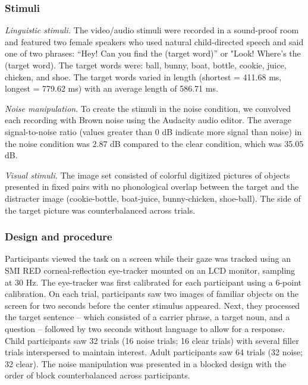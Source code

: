 \documentclass[,man,floatsintext]{apa6}
\begin{document}
\hypertarget{stimuli-1}{%
\subsubsection{Stimuli}\label{stimuli-1}}

\emph{Linguistic stimuli.} The video/audio stimuli were recorded in a
sound-proof room and featured two female speakers who used natural
child-directed speech and said one of two phrases: \enquote{Hey! Can you
find the (target word)} or "Look! Where's the (target word). The target
words were: ball, bunny, boat, bottle, cookie, juice, chicken, and shoe.
The target words varied in length (shortest = 411.68 ms, longest =
779.62 ms) with an average length of 586.71 ms.

\emph{Noise manipulation}. To create the stimuli in the noise condition,
we convolved each recording with Brown noise using the Audacity audio
editor. The average signal-to-noise ratio (values greater than 0 dB
indicate more signal than noise) in the noise condition was 2.87 dB
compared to the clear condition, which was 35.05 dB.

\emph{Visual stimuli.} The image set consisted of colorful digitized
pictures of objects presented in fixed pairs with no phonological
overlap between the target and the distracter image (cookie-bottle,
boat-juice, bunny-chicken, shoe-ball). The side of the target picture
was counterbalanced across trials.

\hypertarget{design-and-procedure-1}{%
\subsubsection{Design and procedure}\label{design-and-procedure-1}}

Participants viewed the task on a screen while their gaze was tracked
using an SMI RED corneal-reflection eye-tracker mounted on an LCD
monitor, sampling at 30 Hz. The eye-tracker was first calibrated for
each participant using a 6-point calibration. On each trial,
participants saw two images of familiar objects on the screen for two
seconds before the center stimulus appeared. Next, they processed the
target sentence -- which consisted of a carrier phrase, a target noun,
and a question -- followed by two seconds without language to allow for
a response. Child participants saw 32 trials (16 noise trials; 16 clear
trials) with several filler trials interspersed to maintain interest.
Adult participants saw 64 trials (32 noise; 32 clear). The noise
manipulation was presented in a blocked design with the order of block
counterbalanced across participants.
\end{document}
